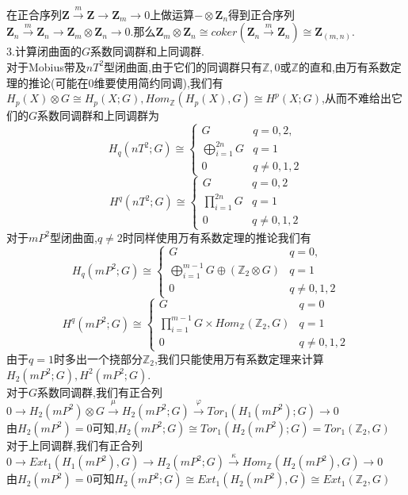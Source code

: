 \documentclass[b5paper]{ctexart}
\newcommand{\es}[5]{$#1\xrightarrow{#2}#3\xrightarrow{#4}#5\xrightarrow{}0$}
\newcommand{\ess}[5]{$0\xrightarrow{}#1\xrightarrow{#2}#3\xrightarrow{#4}#5\xrightarrow{}0$}
\begin{document}
在正合序列\es{\mathbf{Z}}{m}{\mathbf{Z}}{}{\mathbf{Z}_m}上做运算$-\otimes \mathbf{Z}_n$得到正合序列\es{\mathbf{Z}_n}{m}{\mathbf{Z}_n}{}{\mathbf{Z}_m\otimes \mathbf{Z}_n}.那么$\mathbf{Z}_m\otimes \mathbf{Z}_n\cong coker(\mathbf{Z}_n\xrightarrow{m}\mathbf{Z}_n)\cong \mathbf{Z}_{(m,n)}$.\\
3.计算闭曲面的$G$系数同调群和上同调群.\\
对于Mobius带及$nT^2$型闭曲面,由于它们的同调群只有$\mathbb{Z},0$或$\mathbb{Z}$的直和,由万有系数定理的推论(可能在0维要使用简约同调),我们有$H_p(X)\otimes G\cong H_p(X;G),Hom_{\mathbb{Z}}(H_p(X),G)\cong H^p(X;G)$,从而不难给出它们的$G$系数同调群和上同调群为
\[H_q(nT^2;G)\cong\left\lbrace 
\begin{array}{ll}
G & q=0,2,\\
\bigoplus\limits_{i=1}^{2n}G& q=1\\
0& q\neq 0,1,2
\end{array}
\right. 
\]
\[H^q(nT^2;G)\cong\left\lbrace 
\begin{array}{ll}
G& q=0,2\\
\prod_{i=1}^{2n}G& q=1\\
0& q\neq 0,1,2
\end{array}\right. 
\]
对于$mP^2$型闭曲面,$q\neq 2$时同样使用万有系数定理的推论我们有
\[H_q(mP^2;G)\cong\left\lbrace 
\begin{array}{ll}
G & q=0,\\
\bigoplus\limits_{i=1}^{m-1}G\oplus(\mathbb{Z}_2\otimes G)& q=1\\
0& q\neq 0,1,2
\end{array}
\right. 
\]
\[H^q(mP^2;G)\cong\left\lbrace 
\begin{array}{ll}
G& q=0\\
\prod_{i=1}^{m-1}G\times Hom_{\mathbb{Z}}(\mathbb{Z}_2,G)& q=1\\
0& q\neq 0,1,2
\end{array}\right. 
\]
由于$q=1$时多出一个挠部分$\mathbb{Z}_2$,我们只能使用万有系数定理来计算$H_2(mP^2;G),H^2(mP^2;G)$.\\
对于$G$系数同调群,我们有正合列\\
\ess{H_2(mP^2)\otimes G}{\mu}{H_2(mP^2;G)}{\varphi}{Tor_1(H_1(mP^2);G)}\\
由$H_2(mP^2)=0$可知,$H_2(mP^2;G)\cong Tor_1(H_2(mP^2);G)=Tor_1(\mathbb{Z}_2,G)$\\
对于上同调群,我们有正合列\\
\ess{Ext_1(H_1(mP^2),G)}{}{H_2(mP^2;G)}{\kappa}{Hom_{\mathbb{Z}}(H_2(mP^2),G)}\\
由$H_2(mP^2)=0$可知${H_2(mP^2;G)}\cong{Ext_1(H_2(mP^2),G)}\cong Ext_1(\mathbb{Z}_2,G)$\\
\end{document}
